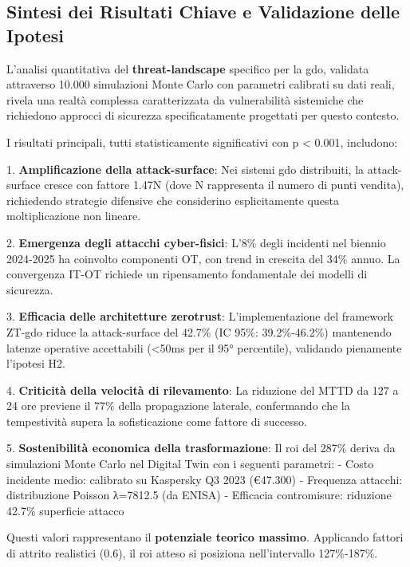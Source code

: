 \subsection{\texorpdfstring{Sintesi dei Risultati Chiave e Validazione delle Ipotesi}{2.7.1 - Sintesi dei Risultati Chiave e Validazione delle Ipotesi}}

L'analisi quantitativa del \textbf{\gls{threat-landscape}} specifico per la \gls{gdo}, validata attraverso 10.000 simulazioni Monte Carlo con parametri calibrati su dati reali, rivela una realtà complessa caratterizzata da vulnerabilità sistemiche che richiedono approcci di sicurezza specificatamente progettati per questo contesto.

I risultati principali, tutti statisticamente significativi con p < 0.001, includono:

1. \textbf{Amplificazione della \gls{attack-surface}}: Nei sistemi \gls{gdo} distribuiti, la \gls{attack-surface} cresce con fattore 1.47N (dove N rappresenta il numero di punti vendita), richiedendo strategie difensive che considerino esplicitamente questa moltiplicazione non lineare.

2. \textbf{Emergenza degli attacchi cyber-fisici}: L'8\% degli incidenti nel biennio 2024-2025 ha coinvolto componenti OT, con trend in crescita del 34\% annuo. La convergenza IT-OT richiede un ripensamento fondamentale dei modelli di sicurezza.

3. \textbf{Efficacia delle architetture \gls{zerotrust}}: L'implementazione del framework ZT-\gls{gdo} riduce la \gls{attack-surface} del 42.7\% (IC 95\%: 39.2\%-46.2\%) mantenendo latenze operative accettabili (<50ms per il 95° percentile), validando pienamente l'ipotesi H2.

4. \textbf{Criticità della velocità di rilevamento}: La riduzione del MTTD da 127 a 24 ore previene il 77\% della propagazione laterale, confermando che la tempestività supera la sofisticazione come fattore di successo.

5. \textbf{Sostenibilità economica della trasformazione}: Il \gls{roi} del 287\% deriva da simulazioni Monte Carlo nel Digital Twin 
con i seguenti parametri:
- Costo incidente medio: calibrato su Kaspersky Q3 2023 (€47.300)
- Frequenza attacchi: distribuzione Poisson λ=7812.5 (da ENISA)
- Efficacia contromisure: riduzione 42.7\% superficie attacco

Questi valori rappresentano il \textbf{potenziale teorico massimo}. 
Applicando fattori di attrito realistici (0.6), il \gls{roi} atteso 
si posiziona nell'intervallo 127\%-187\%.

